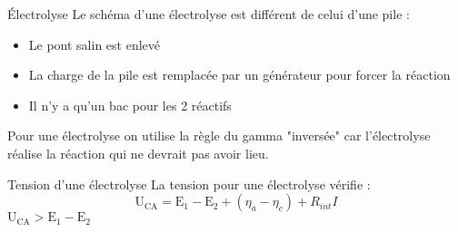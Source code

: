 \documentclass[french, a4paper, 11pt, twocolumn]{article}
\begin{document}
    \begin{cadre}{Électrolyse}
        Le schéma d'une électrolyse est différent de celui d'une pile :
            \begin{itemize}[label=\(\bullet\)]
                \item Le pont salin est enlevé
                \item La charge de la pile est remplacée par un générateur pour forcer la réaction
                \item Il n'y a qu'un bac pour les 2 réactifs
            \end{itemize}

        \tcblower
        Pour une électrolyse on utilise la règle du gamma "inversée" car l'électrolyse réalise
        la réaction qui ne devrait pas avoir lieu.
    \end{cadre}

    \begin{cadre}{Tension d'une électrolyse}
        La tension pour une électrolyse vérifie :
            \[\mathrm{U_{CA}=E_1-E_2}+(\eta_a-\eta_c)+R_{int}I\]
        \tcblower
            \(\mathrm{U_{CA}>E_1-E_2}\)
    \end{cadre}
\end{document}
